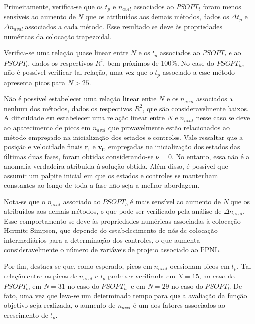 
Primeiramente, verifica-se que os $ t_p $ e $ n_{aval} $ associados ao $ PSOPT_t $ foram menos sensíveis ao aumento de $ N $ que os atribuídos aos demais métodos, dados os $ \Delta t_p $ e $ \Delta n_{aval} $ associados a cada método. Esse resultado se deve às propriedades numéricas da colocação trapezoidal. 

Verifica-se uma relação quase linear entre $ N $ e os $ t_p $ associados ao $ PSOPT_t $ e ao $ PSOPT_l $, dados os respectivos $ R^2 $, bem próximos de 100\%. No caso do $ PSOPT_h $, não é possível verificar tal relação, uma vez que o $ t_p $ associado a esse método apresenta picos para $ N > 25 $. 

Não é possível estabelecer uma relação linear entre $ N $ e os $ n_{aval} $ associados a nenhum dos métodos, dados os respectivos $ R^2 $, que são consideravelmente baixos. A dificuldade em estabelecer uma relação linear entre $ N $ e $ n_{aval} $ nesse caso se deve ao aparecimento de picos em $ n_{aval} $ que provavelmente estão relacionados ao método empregado na inicialização dos estados e controles. Vale ressaltar que a posição e velocidade finais $ \mathbf{r_f} $ e $ \mathbf{v_f} $, empregadas na inicialização dos estados das últimas duas fases, foram obtidas considerando-se $ \nu = 0 $. No entanto, essa não é a anomalia verdadeira atribuída à solução obtida. Além disso, é possível que assumir um palpite inicial em que os estados e controles se mantenham constantes ao longo de toda a fase não seja a melhor abordagem. 

Nota-se que o $ n_{aval} $ associado ao $ PSOPT_h $ é mais sensível ao aumento de $ N $ que os atribuídos aos demais métodos, o que pode ser verificado pela análise de $ \Delta n_{aval} $. Esse comportamento se deve às propriedades numéricas associadas à colocação Hermite-Simpson, que depende do estabelecimento de nós de colocação intermediários para a determinação dos controles, o que aumenta consideravelmente o número de variáveis de projeto associado ao PPNL. 

Por fim, destaca-se que, como esperado, picos em $ n_{aval} $ ocasionam picos em $ t_p $. Tal relação entre os picos de $ n_{aval} $ e $ t_p $ pode ser verificada em $ N = 15 $, no caso do $ PSOPT_t $, em $ N = 31 $ no caso do $ PSOPT_h $, e em $ N = 29 $ no caso do $ PSOPT_l $. De fato, uma vez que leva-se um determinado tempo para que a avaliação da função objetivo seja realizada, o aumento de $ n_{aval} $ é um dos fatores associados ao crescimento de $ t_p $. 

